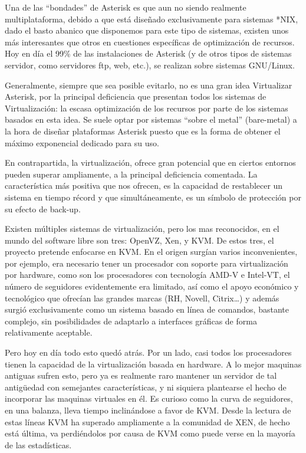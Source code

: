 Una de las ``bondades'' de Asterisk es que aun no siendo realmente multiplataforma, debido a que está diseñado exclusivamente para sistemas *NIX, dado el basto abanico que disponemos para este tipo de sistemas, existen unos más interesantes que otros en cuestiones específicas de optimización de recursos. Hoy en día el 99\% de las instalaciones de Asterisk (y de otros tipos de sistemas servidor, como servidores ftp, web, etc.), se realizan sobre sistemas GNU/Linux. 

Generalmente, siempre que sea posible evitarlo, no es una gran idea Virtualizar Asterisk, por la principal deficiencia que presentan todos los sistemas de Virtualización: la escasa optimización de los recursos por parte de los sistemas basados en esta idea. Se suele optar por sistemas “sobre el metal” (bare-metal) a la hora de diseñar plataformas Asterisk puesto que es la forma de obtener el máximo exponencial dedicado para su uso.

En contrapartida, la virtualización, ofrece gran potencial que en ciertos entornos pueden superar ampliamente, a la principal deficiencia comentada. La característica más positiva que nos ofrecen, es la capacidad de restablecer un sistema en tiempo récord y que simultáneamente, es un símbolo de protección por su efecto de back-up.

Existen múltiples sistemas de virtualización, pero los mas reconocidos, en el mundo del software libre son tres: OpenVZ, Xen, y KVM. De estos tres, el proyecto pretende enfocarse en KVM. En el origen surgían varios inconvenientes, por ejemplo, era necesario tener un procesador con soporte para virtualización por hardware, como son los procesadores con tecnología AMD-V e Intel-VT, el número de seguidores evidentemente era limitado, así como el apoyo económico y tecnológico que ofrecían las grandes marcas (RH, Novell, Citrix…) y además surgió exclusivamente como un sistema basado en línea de comandos, bastante complejo, sin posibilidades de adaptarlo a interfaces gráficas de forma relativamente aceptable.

Pero hoy en día todo esto quedó atrás. Por un lado, casi todos los procesadores tienen la capacidad de la virtualización basada en hardware. A lo mejor maquinas antiguas sufren esto, pero ya es realmente raro mantener un servidor de tal antigüedad con semejantes características, y ni siquiera plantearse el hecho de incorporar las maquinas virtuales en él. Es curioso como la curva de seguidores, en una balanza, lleva tiempo inclinándose a favor de KVM. Desde la lectura de estas líneas KVM ha superado ampliamente a la comunidad de XEN, de hecho está última, va perdiéndolos por causa de KVM como puede verse en la mayoría de las estadísticas.

